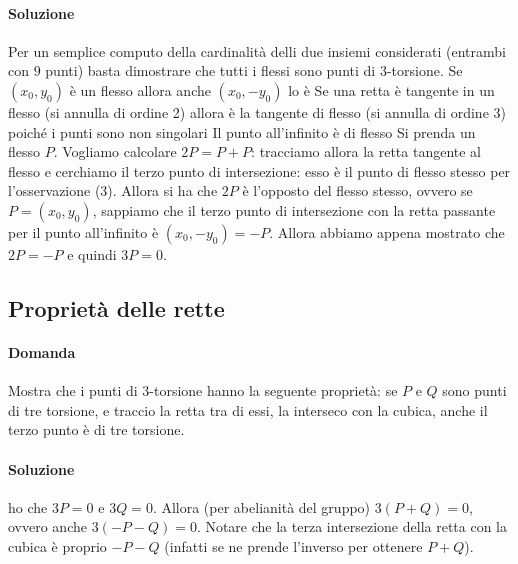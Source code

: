 \paragraph{Soluzione}
 Per un semplice computo della cardinalità delli due insiemi considerati (entrambi con $9$ punti) basta dimostrare che tutti i flessi sono punti di $3$-torsione.
 Se $(x_0, y_0)$ è un flesso allora anche $(x_0, -y_0)$ lo è
 Se una retta è tangente in un flesso (si annulla di ordine 2) allora è la tangente di flesso (si annulla di ordine 3) poiché i punti sono non singolari
 Il punto all'infinito è di flesso
 Si prenda un flesso $P$. Vogliamo calcolare $2P = P + P$: tracciamo allora la retta tangente al flesso e cerchiamo il terzo punto di intersezione: esso è il punto di flesso stesso per l'osservazione (3). Allora si ha che $2P$ è l'opposto del flesso stesso, ovvero se $P = (x_0, y_0)$, sappiamo che il terzo punto di intersezione con la retta passante per il punto all'infinito è $(x_0, -y_0) = -P$. Allora abbiamo appena mostrato che $2P = -P$ e quindi $3P = 0$.

\subsection{Proprietà delle rette}
\paragraph{Domanda} Mostra che i punti di $3$-torsione hanno la seguente proprietà: se $P$ e $Q$ sono punti di tre torsione, e traccio la retta tra di essi, la interseco con la cubica, anche il terzo punto è di tre torsione.

\paragraph{Soluzione}
 ho che $3P = 0$ e $3Q = 0$. Allora (per abelianità del gruppo) $3(P + Q) = 0$, ovvero anche $3(- P - Q) = 0$.
 Notare che la terza intersezione della retta con la cubica è proprio $- P - Q$ (infatti se ne prende l'inverso per ottenere $P + Q$).

